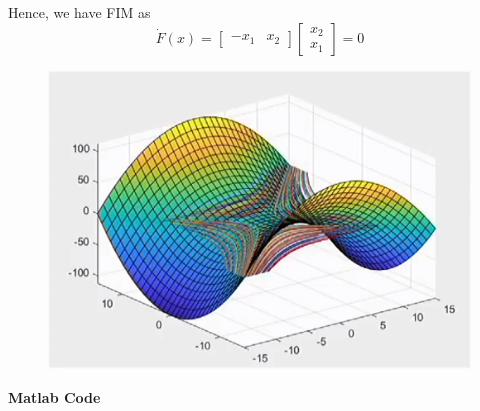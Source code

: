 \documentclass{homeworg}
\begin{document}
Hence, we have FIM as
\begin{equation*}
  \dot{F}(x) =
  \begin{bmatrix}
    -x_1 & x_2
  \end{bmatrix}
  \begin{bmatrix}
    x_2 \\
    x_1
  \end{bmatrix}
  = 0
\end{equation*}
\begin{figure}[h]
  \includegraphics[width=.45\textwidth]{fig08.png}
  \centering
\end{figure}

\newpage
\noindent
\textbf{Matlab Code}\\



%
\end{document}
